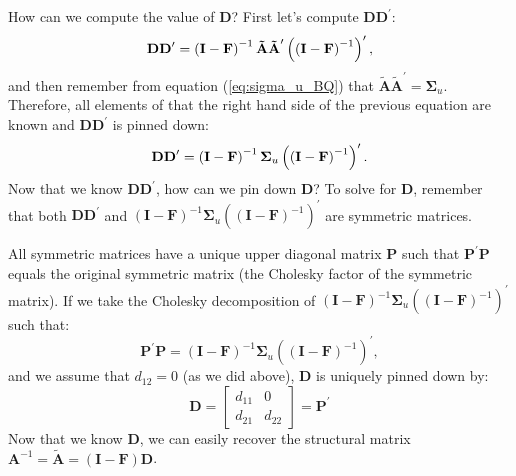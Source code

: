 \documentclass[11pt,a4paper]{report}
\numberwithin{equation}{chapter}
\numberwithin{section}{chapter}
\begin{document}
How can we compute the value of $\mathbf{D}$? First let's compute $\mathbf{DD%
}^{\prime }$:%
\begin{equation*}
\mathbf{DD}^{\prime }=\left( \mathbf{I}-\mathbf{F}\right) ^{-1}\mathbf{%
\tilde{A}\tilde{A}}^{\prime }\left( \left( \mathbf{I}-\mathbf{F}\right)
^{-1}\right) ^{\prime },
\end{equation*}%
\newline
and then remember from equation (\ref{eq:sigma_u_BQ}) that $\mathbf{\tilde{A}%
\tilde{A}}^{\prime }=\mathbf{\Sigma }_{u}$. Therefore, all elements of that
the right hand side of the previous equation are known and $\mathbf{DD}%
^{\prime }$ is pinned down:%
\begin{equation*}
\mathbf{DD}^{\prime }=\left( \mathbf{I}-\mathbf{F}\right) ^{-1}\mathbf{%
\Sigma }_{u}\left( \left( \mathbf{I}-\mathbf{F}\right) ^{-1}\right) ^{\prime
}.
\end{equation*}%
Now that we know $\mathbf{DD}^{\prime }$, how can we pin down $\mathbf{D}$?
To solve for $\mathbf{D}$, remember that both $\mathbf{DD}^{\prime }$ and $%
\left( \mathbf{I}-\mathbf{F}\right) ^{-1}\mathbf{\Sigma }_{u}\left( \left( 
\mathbf{I}-\mathbf{F}\right) ^{-1}\right) ^{\prime }$ are symmetric matrices.

All symmetric matrices have a unique upper diagonal matrix $\mathbf{P}$ such
that $\mathbf{P}^{\prime }\mathbf{P}$ equals the original symmetric matrix
(the Cholesky factor of the symmetric matrix). If we take the Cholesky
decomposition of $\left( \mathbf{I}-\mathbf{F}\right) ^{-1}\mathbf{\Sigma }%
_{u}\left( \left( \mathbf{I}-\mathbf{F}\right) ^{-1}\right) ^{\prime }$ such
that: 
\begin{equation*}
\mathbf{P}^{\prime }\mathbf{P=}\left( \mathbf{I}-\mathbf{F}\right) ^{-1}%
\mathbf{\Sigma }_{u}\left( \left( \mathbf{I}-\mathbf{F}\right) ^{-1}\right)
^{\prime },
\end{equation*}%
and we assume that $d_{12}=0$ (as we did above), $\mathbf{D}$ is uniquely
pinned down by:%
\begin{equation*}
\mathbf{D}=\left[ 
\begin{array}{cc}
d_{11} & 0 \\ 
d_{21} & d_{22}%
\end{array}%
\right] =\mathbf{P}^{\prime }
\end{equation*}%
Now that we know $\mathbf{D}$, we can easily recover the structural matrix $%
\mathbf{A}^{-1}=\mathbf{\tilde{A}}=\left( \mathbf{I}-\mathbf{F}\right) 
\mathbf{D}$.
\end{document}

